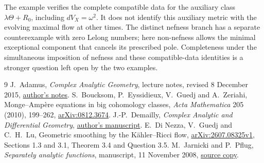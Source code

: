 \documentclass[11pt]{article}
\begin{document}
The example verifies the complete compatible data for the auxiliary
class $\lambda\Theta+R_0$, including $dV_X=\omega^2$.
It does not identify this auxiliary metric with the evolving maximal
flow at other times. The distinct nefness branch has a separate
counterexample with zero Lelong numbers; here non-nefness allows the
minimal exceptional component that cancels its prescribed pole. Completeness
under the simultaneous imposition of nefness and these compatible-data
identities is a stronger question left open by the two examples.

\begin{thebibliography}{9}
 J.~Adamus, \emph{Complex Analytic Geometry},
lecture notes, revised 8 December 2015,
\href{https://www.math.uwo.ca/faculty/adamus/teaching/9607b2019/CAGI.pdf}{author's notes}.
 S.~Boucksom, P.~Eyssidieux, V.~Guedj and A.~Zeriahi,
Monge--Amp\`ere equations in big cohomology classes,
\emph{Acta Mathematica} 205 (2010), 199--262,
\href{https://arxiv.org/abs/0812.3674}{arXiv:0812.3674}.
 J.-P.~Demailly, \emph{Complex Analytic and Differential Geometry},
\href{https://www-fourier.univ-grenoble-alpes.fr/~demailly/manuscripts/agbook.pdf}{author's manuscript}.
 E.~Di Nezza, V.~Guedj and C.~H.~Lu,
Geometric smoothing by the K\"ahler--Ricci flow,
\href{https://arxiv.org/abs/2607.08325}{arXiv:2607.08325v1},
Sections 1.3 and 3.1, Theorem 3.4 and Question 3.5.
 M.~Jarnicki and P.~Pflug, \emph{Separately analytic functions},
manuscript, 11 November 2008,
\href{https://www.math.stonybrook.edu/~ebedford/PapersForM537/JarnickiPflugSepHolo081111.pdf}{source copy}.
\end{thebibliography}
\end{document}
